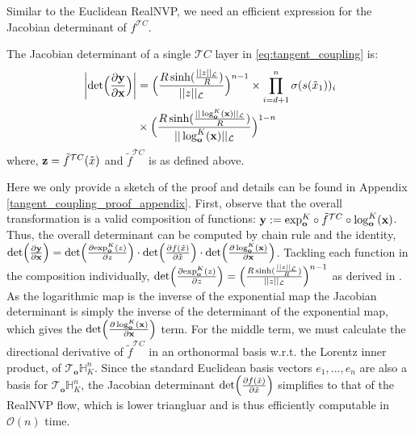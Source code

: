 Similar to the Euclidean RealNVP, we need an efficient expression for the Jacobian determinant of $f^{\mathcal{T}C}$.
\begin{prop}
The Jacobian determinant of a single $\mathcal{T}C$ layer in \eqref{eq:tangent_coupling} is:
\begin{align}
     \left|\textnormal{det}\Big (\frac{\partial \textbf{y}}{\partial \textbf{x}}\Big)\right| &= \Big(\frac{R\sinh(\frac{||z||_{\mathcal{L}}}{R})}{||z||_{\mathcal{L}}}\Big)^{n-1} \times \prod_{i=d+1}^n\sigma(s(\tilde{x}_1))_i  \nonumber\\
     & \times \Big(\frac{R\sinh(\frac{||\log^K_{\textbf{o}}(\textbf{x})||_{\mathcal{L}}}{R})}{||\log^K_{\textbf{o}}(\textbf{x})||_{\mathcal{L}}}\Big)^{1-n}
\end{align}
where, $ \mathbf{z} =  \tilde{f}^{\mathcal{T}C}(\tilde{x})$ and $\tilde{f}^{\mathcal{T}C}$ is as defined above.
\end{prop}
\begin{proofsketch}
Here we only provide a sketch of the proof and details can be found in Appendix \ref{tangent_coupling_proof_appendix}. First, observe  that the overall transformation  is a valid composition of functions: $\mathbf{y} := \textnormal{exp}_{\textbf{o}}^K \circ \tilde{f}^{\mathcal{T}C} \circ \log_{\textbf{o}}^K(\textbf{x})$. Thus, the overall determinant can be computed by chain rule and the identity,  $\textnormal{det}\Big (\frac{\partial \textbf{y}}{\partial \textbf{x}}\Big) =  \textnormal{det}\Big (\frac{\partial \textnormal{exp}_{\textbf{o}}^K(z)}{\partial z}\Big) \cdot \textnormal{det}\Big (\frac{\partial f(\tilde{x})}{\partial \tilde{x}}\Big) \cdot  \textnormal{det}\Big (\frac{\partial \log_{\textbf{o}}^K(\textbf{x})}{\partial \textbf{x}}\Big)$. Tackling each function in the composition individually, $\textnormal{det}\Big (\frac{\partial \textnormal{exp}_{\textbf{o}}^K(z)}{\partial z}\Big) = \Big(\frac{R\sinh(\frac{||z||_{\mathcal{L}}}{R})}{||z||_{\mathcal{L}}}\Big)^{n-1}$ as derived in \citet{skopek2019mixed}. As the logarithmic map is the inverse of the exponential map the Jacobian determinant is simply the inverse of the determinant of the exponential map, which gives the $\textnormal{det}\Big (\frac{\partial \log_{\textbf{o}}^K(\textbf{x})}{\partial \textbf{x}}\Big)$ term. 
For the middle term, we must calculate the directional derivative of $\tilde{f}^{\mathcal{T}C}$ in an orthonormal basis w.r.t. the Lorentz inner product, of $\mathcal{T}_{\textbf{o}}\mathbb{H}^{n}_K$. Since the standard Euclidean basis vectors $e_1, ..., e_n$ are also a basis for $\mathcal{T}_{\textbf{o}}\mathbb{H}^{n}_K$, the Jacobian determinant $\textnormal{det}\Big (\frac{\partial f(\tilde{x})}{\partial \tilde{x}}\Big)$ simplifies to that of the RealNVP flow, which is lower triangluar and is thus efficiently computable in $\mathcal{O}(n)$ time.

\end{proofsketch}
